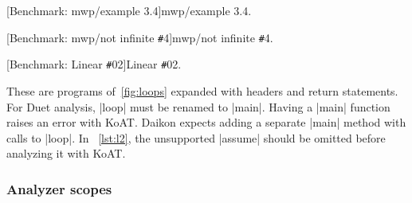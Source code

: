\begin{center}
\begin{minipage}[t]{.47\textwidth}
\captionsetup{type=lstlisting}
[Benchmark: mwp/example 3.4]{mwp/example 3.4.}
\label{lst:ex34}
\end{minipage}\hfill
\begin{minipage}[t]{.50\textwidth}
\captionsetup{type=lstlisting}
[Benchmark: mwp/not infinite \texttt{\#}4]{mwp/not infinite \texttt{\#}4.}
\label{lst:ni4}
\end{minipage}
\end{center}%
\begin{center}
\begin{minipage}[t]{.50\textwidth}
\captionsetup{type=lstlisting}
[Benchmark: Linear \texttt{\#}02]{Linear \texttt{\#}02.}
\label{lst:l2}
\end{minipage}
\end{center}

These are programs of~\autoref{fig:loops} expanded with headers and return statements.
For Duet analysis, \pr|loop| must be renamed to \pr|main|.
Having a \pr|main| function raises an error with KoAT\@.
Daikon expects adding a separate \pr|main| method with calls to \pr|loop|.
In ~\autoref{lst:l2}, the unsupported \pr|assume| should be omitted before analyzing it with KoAT\@.

\subsubsection{Analyzer scopes}\label{subsec:analyzer-scopes}

